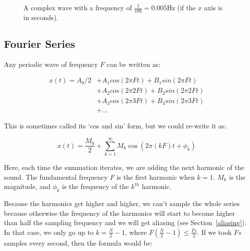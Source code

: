 \begin{figure}
  \centering
  \caption{A complex wave with a frequency of
  $\frac{1}{180} = 0.00\overline{5}\si{\hertz}$ (if the $x$ axis is in
  seconds).}
  \label{fig-complex-wave}
\end{figure} 

\subsection{Fourier Series}

Any periodic wave of frequency $F$ can be written as:

\begin{align*}
  x(t) = A_0 / 2 &+ A_1 cos(2 \pi Ft) + B_1 sin(2\pi Ft)\\
                 &+ A_2 cos(2 \pi 2Ft) + B_2 sin(2\pi 2Ft)\\
                 &+ A_3 cos(2 \pi 3Ft) + B_3 sin(2\pi 3Ft)\\
                 &+ \dots
\end{align*}

This is sometimes called its `cos and sin' form, but we could re-write it as:

\[
  x(t) = \frac{M_0}{2} + \sum\limits^\infty_{k=1}M_k\cos(2\pi (kF)t + \phi_k)
\]

Here, each time the summation iterates, we are adding the next harmonic of the
sound. The fundamental frequency $F$ is the first harmonic when $k=1$. $M_k$ is
the magnitude, and $\phi_k$ is the frequency of the $k^{th}$ harmonic.

Because the harmonics get higher and higher, we can't sample the whole series
because otherwise the frequency of the harmonics will start to become higher
than half the sampling frequency and we will get aliasing (see
Section~\ref{aliasing}). In that case, we only go up to $k=\frac{N}{2} - 1$,
where $F(\frac{N}{2} - 1) \le \frac{Fs}{2}$. If we took $Fs$ samples every
second, then the formula would be:

